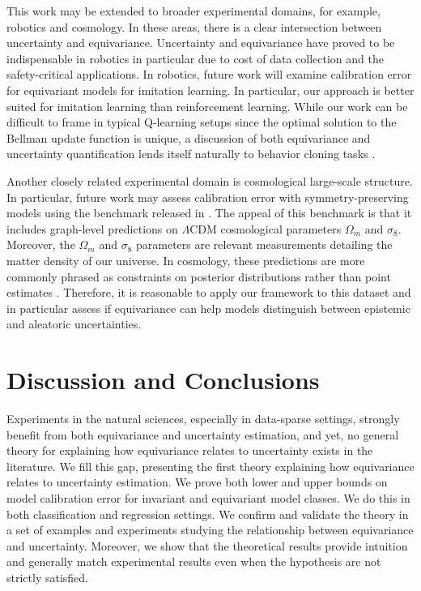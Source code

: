 \documentclass[10pt]{article} %
\theoremstyle{definition}
\begin{document}
This work may be extended to broader experimental domains, for example, robotics and cosmology. In these areas, there is a clear intersection between uncertainty and equivariance. Uncertainty and equivariance have proved to be indispensable in robotics in particular due to cost of data collection and the safety-critical applications. In robotics, future work will examine calibration error for equivariant models for imitation learning. In particular, our approach is better suited for imitation learning than reinforcement learning.  While our work can be difficult to frame in typical Q-learning setups since the optimal solution to the Bellman update function is unique, a discussion of both equivariance and uncertainty quantification lends itself naturally to behavior cloning tasks \citep{florence2022implicit}.

Another closely related experimental domain is cosmological large-scale structure. In particular, future work may assess calibration error with symmetry-preserving models using the benchmark released in \cite{balla2024cosmic}. The appeal of this benchmark is that it includes graph-level predictions on $\Lambda$CDM \citep{ryden2016introduction, carroll2019spacetime} cosmological parameters $\Omega_m$ and $\sigma_8$. Moreover, the $\Omega_m$ and $\sigma_8$ parameters are relevant measurements detailing the matter density of our universe. In cosmology, these predictions are more commonly phrased as constraints on posterior distributions rather than point estimates \citep[e.g.,][]{dark2016dark, abbott2022dark}. Therefore, it is reasonable to apply our framework to this dataset and in particular assess if equivariance can help models distinguish between epistemic and aleatoric uncertainties. 

\section{Discussion and Conclusions}

Experiments in the natural sciences, especially in data-sparse settings, strongly benefit from both equivariance and uncertainty estimation, and yet, no general theory for explaining how equivariance relates to uncertainty exists in the literature. We fill this gap, presenting the first theory explaining how equivariance relates to uncertainty estimation. We prove both lower and upper bounds on model calibration error for invariant and equivariant model classes. We do this in both classification and regression settings. We confirm and validate the theory in a set of examples and experiments studying the relationship between equivariance and uncertainty.  Moreover, we show that the theoretical results provide intuition and generally match experimental results even when the hypothesis are not strictly satisfied. 
\end{document}
